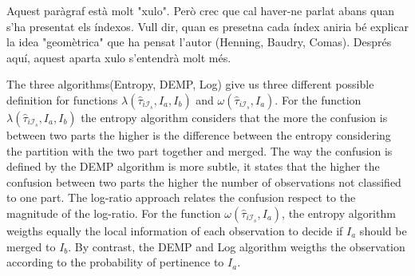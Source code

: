 \documentclass[10pt, a4paper]{article}
\begin{document}
{\color{red} Aquest paràgraf està molt "xulo". Però crec que cal haver-ne parlat abans quan s'ha presentat els índexos. 
Vull dir, quan es presetna cada índex aniria bé explicar la idea "geomètrica" que ha pensat l'autor (Henning,  Baudry, Comas). Després aquí, aquest aparta xulo s'entendrà molt més. }


The three algorithms(Entropy, DEMP, Log) give us three different possible definition for functions $\lambda(\hat{\tau}_{i \mathcal{I}_s}, I_a, I_b)$ and $\omega(\hat{\tau}_{i \mathcal{I}_s}, I_a)$. For the function $\lambda(\hat{\tau}_{i \mathcal{I}_s}, I_a, I_b)$ the entropy algorithm considers that the more the confusion is between two parts the higher is the difference between the entropy considering the partition with the two part together and merged. The way the confusion is defined by the DEMP algorithm is more subtle, it states that the higher the confusion between two parts the higher the number of observations not classified to one part. The log-ratio approach relates the confusion respect to the magnitude of the log-ratio. For the function $\omega(\hat{\tau}_{i \mathcal{I}_s}, I_a)$, the entropy algorithm weigths equally the local information of each observation to decide if $I_a$ should be merged to $I_b$. By contrast, the DEMP and Log algorithm weigths the observation according to the probability of pertinence to $I_a$. 
\end{document}
